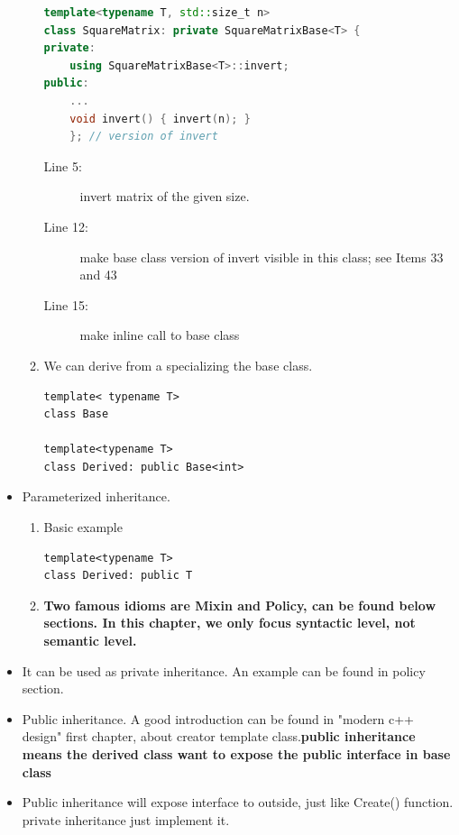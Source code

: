 \documentclass[a4paper,11pt,twoside]{book}
\begin{document}
\begin{itemize}
\begin{enumerate}
\begin{lstlisting}[frame=single, language=c++]
template<typename T, std::size_t n>
class SquareMatrix: private SquareMatrixBase<T> {
private:
	using SquareMatrixBase<T>::invert; 
public:
	...
	void invert() { invert(n); } 
	}; // version of invert
\end{lstlisting}
\begin{description}
	\item[Line 5:] invert matrix of the given size.
	\item[Line 12:] make base class version of invert visible in this class; see Items 33 and 43
	\item[Line 15:] make inline call to base class
\end{description}

	
	\item We can derive from a specializing the base class.
\begin{lstlisting}[numbers=none]
template< typename T>
class Base
	
template<typename T>
class Derived: public Base<int>
\end{lstlisting}
\end{enumerate}

\item Parameterized inheritance.
	\begin{enumerate}
	\item Basic example 
\begin{lstlisting}[numbers=none]
template<typename T>
class Derived: public T
\end{lstlisting}
	
	\item \textbf{Two famous idioms are Mixin and Policy, can be found below sections. In this chapter, we only focus syntactic level, not semantic level.}

	\end{enumerate}

\item It can be used as private inheritance. An example can be found in policy section. 

\item Public inheritance. A good introduction can be found in "modern c++ design" first chapter, about creator template class.\textbf{public inheritance means the derived class want to expose the public interface in base class}

\item Public inheritance will expose interface to outside, just like Create() function. private inheritance just implement it. 


\end{itemize}
\end{document}
